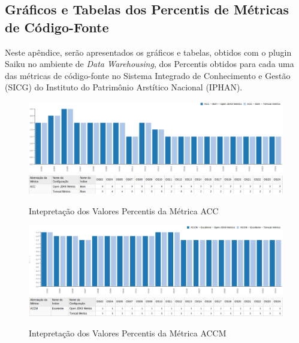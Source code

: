 \begin{apendicesenv}



\chapter{Gráficos e Tabelas dos Percentis de Métricas de Código-Fonte}

Neste apêndice, serão apresentados os gráficos e tabelas, obtidos com o plugin Saiku no ambiente de \textit{Data Warehousing}, dos Percentis obtidos para cada uma das métricas de código-fonte no Sistema Integrado de Conhecimento e Gestão (SICG) do Instituto do Patrimônio Arstítico Nacional (IPHAN).

\label{graphs}

\begin{figure}
\centering
\includegraphics[scale=0.70]{figuras/acc-grafico.eps}
\includegraphics[scale=0.70]{figuras/acc-tabela.eps}
\caption{Intepretação dos Valores Percentis da Métrica ACC}
\label{fig:metric-acc}
\FloatBarrier
\end{figure}

\begin{figure}
\centering
\includegraphics[scale=0.70]{figuras/accm-grafico.eps}
\includegraphics[scale=0.70]{figuras/accm-tabela.eps}
\caption{Intepretação dos Valores Percentis da Métrica ACCM}
\label{fig:metric-accm}
\FloatBarrier
\end{figure}


\end{apendicesenv}
